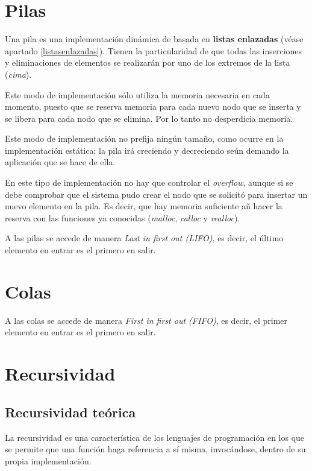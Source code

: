 \documentclass[a4paper, 11pt, titlepage]{article}
\begin{document}
\section{Pilas} 

    Una pila es una implementación dinámica de basada en \textbf{listas enlazadas} 
    (véase apartado \ref{listasenlazadas}). Tienen la particularidad de que todas 
    las inserciones y eliminaciones de elementos se realizarán por uno de los extremos
    de la lista (\textit{cima}).

    Este modo de implementación sólo utiliza la memoria necesaria en cada momento, puesto 
    que se reserva memoria para cada nuevo nodo que se inserta y se libera para cada nodo
    que se elimina. Por lo tanto no desperdicia memoria.

    Este modo de implementación no prefija ningún tamaño, como ocurre en la implementación 
    estática; la pila irá creciendo y decreciendo seún demando la aplicación que se hace de 
    ella.

    En este tipo de implementación no hay que controlar el \textit{overflow}, aunque si se 
    debe comprobar que el sistema pudo crear el nodo que se solicitó para insertar un nuevo 
    elemento en la pila. Es decir, que hay memoria suficiente añ hacer la reserva con las 
    funciones ya conocidas (\textit{malloc}, \textit{calloc} y \textit{realloc}).

    A las pilas se accede de manera \textit{Last in first out (LIFO)}, es decir, el último
    elemento en entrar es el primero en salir.

\section{Colas} %

    A las colas se accede de manera \textit{First in first out (FIFO)}, es decir, el primer 
    elemento en entrar es el primero en salir.

\section{Recursividad}

    \subsection{Recursividad teórica}

        La recursividad es una característica de los lenguajes de programación en los que se permite 
        que una función haga referencia a sí misma, invocándose, dentro de su propia implementación.
\end{document}
